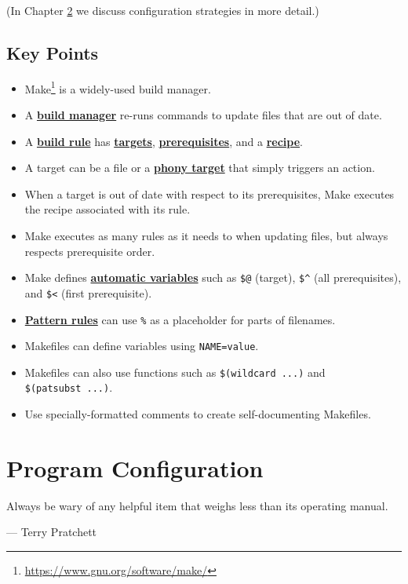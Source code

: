 \documentclass[
]{krantz}
\providecommand{\tightlist}{%
  \setlength{\itemsep}{0pt}\setlength{\parskip}{0pt}}
\renewenvironment{quote}{\begin{VF}}{\end{VF}}
\renewcommand{\href}[2]{#2\footnote{\url{#1}}}
\newcommand{\gref}[2]{\hyperlink{#2}{\textbf{#1}}}
\begin{document}
(In Chapter \ref{config} we discuss configuration strategies in more detail.)

\hypertarget{automate-keypoints}{%
\section{Key Points}\label{automate-keypoints}}

\begin{itemize}
\tightlist
\item
  \href{https://www.gnu.org/software/make/}{Make} is a widely-used build manager.
\item
  A \gref{build manager}{build\_manager} re-runs commands to update files that are out of date.
\item
  A \gref{build rule}{build\_rule} has \gref{targets}{build\_target}, \gref{prerequisites}{prerequisite}, and a \gref{recipe}{build\_recipe}.
\item
  A target can be a file or a \gref{phony target}{phony\_target} that simply triggers an action.
\item
  When a target is out of date with respect to its prerequisites, Make executes the recipe associated with its rule.
\item
  Make executes as many rules as it needs to when updating files, but always respects prerequisite order.
\item
  Make defines \gref{automatic variables}{automatic\_variable} such as \texttt{\$@} (target), \texttt{\$\^{}} (all prerequisites), and \texttt{\$\textless{}} (first prerequisite).
\item
  \gref{Pattern rules}{pattern\_rule} can use \texttt{\%} as a placeholder for parts of filenames.
\item
  Makefiles can define variables using \texttt{NAME=value}.
\item
  Makefiles can also use functions such as \texttt{\$(wildcard\ ...)} and \texttt{\$(patsubst\ ...)}.
\item
  Use specially-formatted comments to create self-documenting Makefiles.
\end{itemize}

\hypertarget{config}{%
\chapter{Program Configuration}\label{config}}

\begin{quote}
Always be wary of any helpful item that weighs less than its operating manual.

--- Terry Pratchett
\end{quote}
\end{document}
